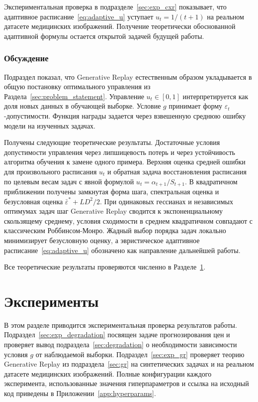\documentclass[a4paper,14pt,oneside,openany]{extarticle}
\begin{document}
Экспериментальная проверка в подразделе~\ref{sec:exp_cxr} показывает, что адаптивное расписание~\eqref{eq:adaptive_u} уступает $u_t = 1/(t+1)$ на реальном датасете медицинских изображений. Получение теоретически обоснованной адаптивной формулы остается открытой задачей будущей работы.

\subsubsection{Обсуждение}

Подраздел показал, что Generative Replay естественным образом укладывается в общую постановку оптимального управления из Раздела~\ref{sec:problem_statement}. Управление $u_t \in [0, 1]$ интерпретируется как доля новых данных в обучающей выборке. Условие $g$ принимает форму $\varepsilon_t$-допустимости. Функция награды задается через взвешенную среднюю ошибку модели на изученных задачах.

Получены следующие теоретические результаты. Достаточные условия допустимости управления через липшицевость потерь и через устойчивость алгоритма обучения к замене одного примера. Верхняя оценка средней ошибки для произвольного расписания $u_t$ и обратная задача восстановления расписания по целевым весам задач с явной формулой $u_t = \alpha_{t+1}/S_{t+1}$. В квадратичном приближении получены замкнутая форма шага, спектральная оценка и безусловная оценка $\bar\varepsilon^* + LD^2/2$. При одинаковых гессианах и независимых оптимумах задач шаг Generative Replay сводится к экспоненциальному скользящему среднему, условия сходимости в среднем квадратичном совпадают с классическим Роббинсом-Монро. Жадный выбор порядка задач локально минимизирует безусловную оценку, а эвристическое адаптивное расписание~\eqref{eq:adaptive_u} обозначено как направление дальнейшей работы.

Все теоретические результаты проверяются численно в Разделе~\ref{sec:experiments}.

\newpage
\section{Эксперименты}\label{sec:experiments}

В этом разделе приводится экспериментальная проверка результатов работы. Подраздел~\ref{sec:exp_degradation} посвящен задаче прогнозирования цен и проверяет вывод подраздела~\ref{sec:degradation} о необходимости зависимости условия $g$ от наблюдаемой выборки. Подраздел~\ref{sec:exp_gr} проверяет теорию Generative Replay из подраздела~\ref{sec:gr} на синтетических задачах и на реальном датасете медицинских изображений. Полные конфигурации каждого эксперимента, использованные значения гиперпараметров и ссылка на исходный код приведены в Приложении~\ref{app:hyperparams}.
\end{document}

